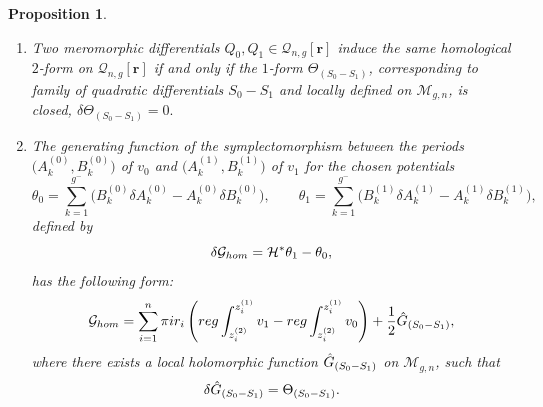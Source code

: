 \documentclass[10pt,a4paper]{article}
\numberwithin{equation}{section}
\newtheorem{Proposition}[Theorem]{Proposition}
\theoremstyle{definition}
\begin{document}
\begin{Proposition} \label{Prop_3}\quad
\begin{enumerate}\itemsep=0pt
\item[$1.$] Two meromorphic differentials $Q_0, Q_1 \in \mathcal{Q}_{n,g}[\textbf{r}]$ induce the same homological $2$-form on $\mathcal{Q}_{n,g}[\textbf{r}]$ if and only if the $1$-form $\Theta_{(S_0-S_1)}$, corresponding to family of quadratic differentials $S_0-S_1$ and locally defined on $\mathcal{M}_{g,n}$,
is closed, $\delta\Theta_{(S_0-S_1)}=0.$

\item[$2.$] The generating function of the symplectomorphism between the periods $\big(A^{(0)}_k,B^{(0)}_k\big)$ of $v_0$ and $\big(A^{(1)}_k,B^{(1)}_k\big)$ of $v_1$ for the chosen potentials \begin{equation}\label{69}\theta_0=\sum^{g^-}_{k=1}\big(B^{(0)}_k \delta A^{(0)}_k - A^{(0)}_k \delta B^{(0)}_k\big), \qquad \theta_1=\sum^{g^-}_{k=1}\big(B^{(1)}_k \delta A^{(1)}_k - A^{(1)}_k \delta B^{(1)}_k\big),\end{equation}
defined by
\begin{equation*}%
\delta\mathcal{G}_{{\rm hom}}=\mathcal{H}^*\theta_1 - \theta_0 ,
\end{equation*}
has the following form:
\begin{equation}\label{71}
\mathcal{G}_{{\rm hom}}=\sum^n_{i=1}\pi {\rm i} r_i\left({\rm reg}\int^{z^{(1)}_i}_{z^{(2)}_i}v_1 -{\rm reg}\int^{z^{(1)}_i}_{z^{(2)}_i}v_0 \right)+\frac{1}{2}\Hat{G}_{(S_0 -S_1)},
\end{equation}
where there exists a local holomorphic function $\Hat{G}_{(S_0 -S_1)}$ on $\mathcal{M}_{g,n}$, such that
\begin{equation*}%
\delta\Hat{G}_{(S_0 -S_1)}= \Theta_{(S_0-S_1)}.
\end{equation*}
\end{enumerate}
\end{Proposition}
\end{document}
